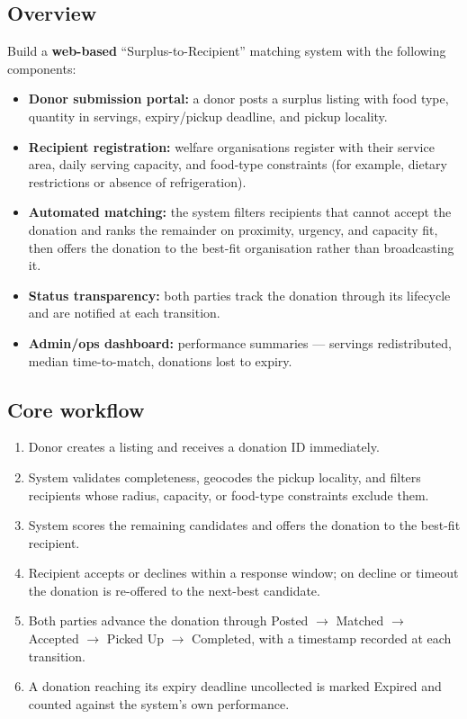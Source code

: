 \documentclass[11pt,a4paper]{article}
\begin{document}
\subsection{Overview}
Build a \textbf{web-based} ``Surplus-to-Recipient'' matching system with the following components:
\begin{itemize}[leftmargin=0.7cm]
    \item \textbf{Donor submission portal:} a donor posts a surplus listing with food type, quantity in servings, expiry/pickup deadline, and pickup locality.
    \item \textbf{Recipient registration:} welfare organisations register with their service area, daily serving capacity, and food-type constraints (for example, dietary restrictions or absence of refrigeration).
    \item \textbf{Automated matching:} the system filters recipients that cannot accept the donation and ranks the remainder on proximity, urgency, and capacity fit, then offers the donation to the best-fit organisation rather than broadcasting it.
    \item \textbf{Status transparency:} both parties track the donation through its lifecycle and are notified at each transition.
    \item \textbf{Admin/ops dashboard:} performance summaries --- servings redistributed, median time-to-match, donations lost to expiry.
\end{itemize}

\subsection{Core workflow}
\begin{enumerate}[leftmargin=0.7cm]
    \item Donor creates a listing and receives a donation ID immediately.
    \item System validates completeness, geocodes the pickup locality, and filters recipients whose radius, capacity, or food-type constraints exclude them.
    \item System scores the remaining candidates and offers the donation to the best-fit recipient.
    \item Recipient accepts or declines within a response window; on decline or timeout the donation is re-offered to the next-best candidate.
    \item Both parties advance the donation through Posted $\rightarrow$ Matched $\rightarrow$ Accepted $\rightarrow$ Picked Up $\rightarrow$ Completed, with a timestamp recorded at each transition.
    \item A donation reaching its expiry deadline uncollected is marked Expired and counted against the system's own performance.
\end{enumerate}
\end{document}
